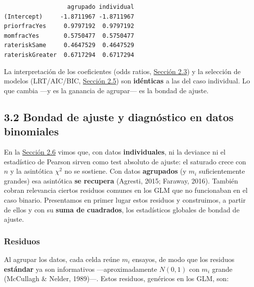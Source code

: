 \documentclass[
  letterpaper,
  DIV=11,
  numbers=noendperiod]{scrartcl}
\begin{document}
\begin{verbatim}
                  agrupado individual
(Intercept)     -1.8711967 -1.8711967
priorfracYes     0.9797192  0.9797192
momfracYes       0.5750477  0.5750477
rateriskSame     0.4647529  0.4647529
rateriskGreater  0.6717294  0.6717294
\end{verbatim}

La interpretación de los coeficientes (odds ratios,
\protect\hyperlink{sec-u12-interpretacion}{Sección 2.3}) y la selección
de modelos (LRT/AIC/BIC, \protect\hyperlink{sec-u12-inferencia}{Sección
2.5}) son \textbf{idénticas} a las del caso individual. Lo que cambia
---y es la ganancia de agrupar--- es la bondad de ajuste.

\hypertarget{sec-u13-gof-binomial}{%
\subsection{3.2 Bondad de ajuste y diagnóstico en datos
binomiales}\label{sec-u13-gof-binomial}}

En la \protect\hyperlink{sec-u12-diagnostico}{Sección 2.6} vimos que,
con datos \textbf{individuales}, ni la deviance ni el estadístico de
Pearson sirven como test absoluto de ajuste: el saturado crece con \(n\)
y la asintótica \(\chi^2\) no se sostiene. Con datos \textbf{agrupados}
(y \(m_i\) suficientemente grandes) esa asintótica \textbf{se recupera}
(Agresti, 2015; Faraway, 2016). También cobran relevancia ciertos
residuos comunes en los GLM que no funcionaban en el caso binario.
Presentamos en primer lugar estos residuos y construimos, a partir de
ellos y con su \textbf{suma de cuadrados}, los estadísticos globales de
bondad de ajuste.

\hypertarget{residuos-1}{%
\subsubsection{Residuos}\label{residuos-1}}

Al agrupar los datos, cada celda reúne \(m_i\) ensayos, de modo que los
residuos \textbf{estándar} ya son informativos ---aproximadamente
\(N(0,1)\) con \(m_i\) grande (McCullagh \& Nelder, 1989)---. Estos
residuos, genéricos en los GLM, son:
\end{document}
